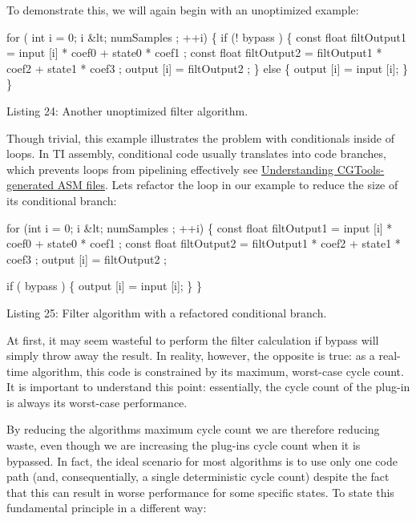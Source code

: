 To demonstrate this, we will again begin with an unoptimized example\+:


\begin{DoxyCode}
\textcolor{keywordflow}{for} ( \textcolor{keywordtype}{int} i = 0; i &lt; numSamples ; ++i)
\{
    \textcolor{keywordflow}{if} (! bypass )
    \{
        \textcolor{keyword}{const} \textcolor{keywordtype}{float} filtOutput1 = input [i] * coef0 + state0 * coef1 ;
        \textcolor{keyword}{const} \textcolor{keywordtype}{float} filtOutput2 = filtOutput1 * coef2 + state1 * coef3 ;
        output [i] = filtOutput2 ;
    \}
    \textcolor{keywordflow}{else}
    \{
        output [i] = input [i];
    \}
\} 
\end{DoxyCode}
  Listing 24\+: Another unoptimized filter algorithm.

Though trivial, this example illustrates the problem with conditionals inside of loops. In T\+I assembly, conditional code usually translates into code branches, which prevents loops from pipelining effectively see \hyperlink{a00362_subsection__understanding_cgtoolsgenerated_asm_files}{Understanding C\+G\+Tools-\/generated A\+S\+M files}. Let\textquotesingle{}s refactor the loop in our example to reduce the size of its conditional branch\+:


\begin{DoxyCode}
\textcolor{keywordflow}{for} (\textcolor{keywordtype}{int} i = 0; i &lt; numSamples ; ++i)
\{
    \textcolor{keyword}{const} \textcolor{keywordtype}{float} filtOutput1 = input [i] * coef0 + state0 * coef1 ;
    \textcolor{keyword}{const} \textcolor{keywordtype}{float} filtOutput2 = filtOutput1 * coef2 + state1 * coef3 ;
    output [i] = filtOutput2 ;

    \textcolor{keywordflow}{if} ( bypass )
    \{
        output [i] = input [i];
    \}
\} 
\end{DoxyCode}
  Listing 25\+: Filter algorithm with a refactored conditional branch.

At first, it may seem wasteful to perform the filter calculation if {\ttfamily bypass} will simply throw away the result. In reality, however, the opposite is true\+: as a real-\/time algorithm, this code is constrained by its maximum, worst-\/case cycle count. It is important to understand this point\+: essentially, the cycle count of the plug-\/in is always its worst-\/case performance.

By reducing the algorithm\textquotesingle{}s maximum cycle count we are therefore reducing waste, even though we are increasing the plug-\/in\textquotesingle{}s cycle count when it is bypassed. In fact, the ideal scenario for most algorithms is to use only one code path (and, consequentially, a single deterministic cycle count) despite the fact that this can result in worse performance for some specific states. To state this fundamental principle in a different way\+:

